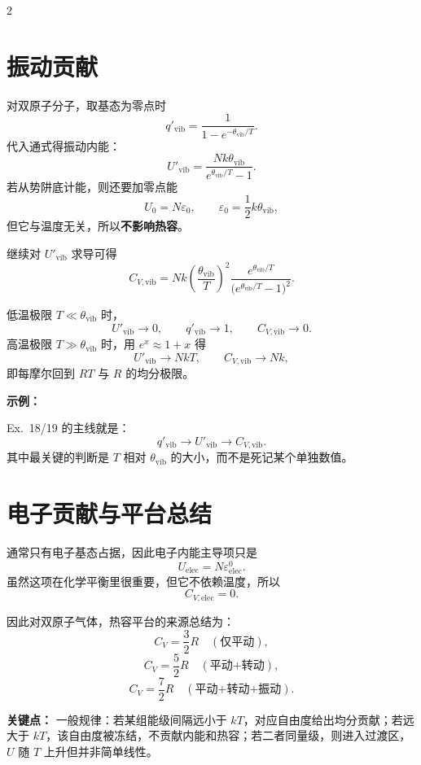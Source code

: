 \documentclass[a4paper,9pt]{article}
\newenvironment{keypoint}
{\par\vspace{0.3em}\noindent\begin{tcolorbox}[colback=keybg,colframe=keycolor,boxrule=0.5pt,arc=2pt,left=2pt,right=2pt,top=2pt,bottom=2pt,boxsep=0pt]\noindent\textcolor{keycolor}{\textbf{关键点：}}}
{\end{tcolorbox}\par\vspace{0.3em}}
\newenvironment{examplebox}
{\par\vspace{0.3em}\noindent\begin{tcolorbox}[colback=boxbg,colframe=derivcolor,boxrule=0.5pt,arc=2pt,left=2pt,right=2pt,top=2pt,bottom=2pt,boxsep=0pt]\scriptsize\noindent\textcolor{derivcolor}{\textbf{示例：}}\par\setlength{\parskip}{0.1ex}\setlength{\itemsep}{0pt}\setlength{\parsep}{0pt}}
{\end{tcolorbox}\par\vspace{0.3em}}
\begin{document}
\begin{multicols}{2}
	\section{振动贡献}

	对双原子分子，取基态为零点时
	\[
		q'_{\mathrm{vib}}=\frac{1}{1-e^{-\theta_{\mathrm{vib}}/T}}.
	\]
	代入通式得振动内能：
	\[
		U'_{\mathrm{vib}}=\frac{Nk\theta_{\mathrm{vib}}}{e^{\theta_{\mathrm{vib}}/T}-1}.
	\]
	若从势阱底计能，则还要加零点能
	\[
		U_0=N\varepsilon_0,
		\qquad
		\varepsilon_0=\frac12k\theta_{\mathrm{vib}},
	\]
	但它与温度无关，所以\textbf{不影响热容}。

	继续对 $U'_{\mathrm{vib}}$ 求导可得
	\[
		C_{V,\mathrm{vib}}=Nk\left(\frac{\theta_{\mathrm{vib}}}{T}\right)^2
		\frac{e^{\theta_{\mathrm{vib}}/T}}{\big(e^{\theta_{\mathrm{vib}}/T}-1\big)^2}.
	\]

	低温极限 $T\ll\theta_{\mathrm{vib}}$ 时，
	\[
		U'_{\mathrm{vib}}\to 0,
		\qquad
		q'_{\mathrm{vib}}\to 1,
		\qquad
		C_{V,\mathrm{vib}}\to 0.
	\]
	高温极限 $T\gg\theta_{\mathrm{vib}}$ 时，用 $e^x\approx 1+x$ 得
	\[
		U'_{\mathrm{vib}}\to NkT,
		\qquad
		C_{V,\mathrm{vib}}\to Nk,
	\]
	即每摩尔回到 $RT$ 与 $R$ 的均分极限。

	\begin{examplebox}
		Ex.~18/19 的主线就是：
		\[
			q'_{\mathrm{vib}} \longrightarrow U'_{\mathrm{vib}} \longrightarrow C_{V,\mathrm{vib}}.
		\]
		其中最关键的判断是 $T$ 相对 $\theta_{\mathrm{vib}}$ 的大小，而不是死记某个单独数值。
	\end{examplebox}

	\section{电子贡献与平台总结}

	通常只有电子基态占据，因此电子内能主导项只是
	\[
		U_{\mathrm{elec}}=N\varepsilon^0_{\mathrm{elec}}.
	\]
	虽然这项在化学平衡里很重要，但它不依赖温度，所以
	\[
		C_{V,\mathrm{elec}}=0.
	\]

	因此对双原子气体，热容平台的来源总结为：
	\[
		C_V=\frac32R \quad (\text{仅平动}),
	\]
	\[
		C_V=\frac52R \quad (\text{平动+转动}),
	\]
	\[
		C_V=\frac72R \quad (\text{平动+转动+振动}).
	\]

	\begin{keypoint}
		一般规律：若某组能级间隔远小于 $kT$，对应自由度给出均分贡献；若远大于 $kT$，该自由度被冻结，不贡献内能和热容；若二者同量级，则进入过渡区，$U$ 随 $T$ 上升但并非简单线性。
	\end{keypoint}


\end{multicols}
\end{document}
